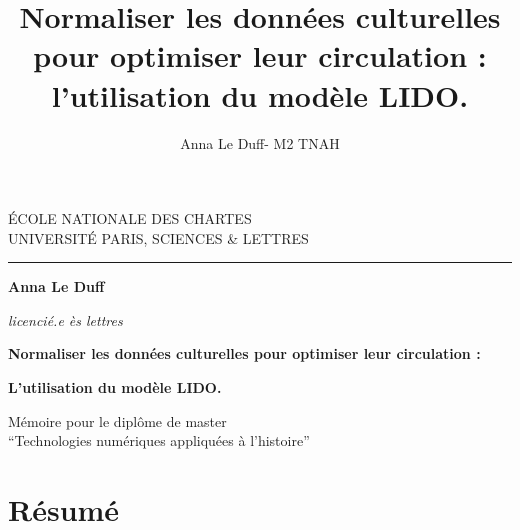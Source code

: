 \documentclass[a4paper,12pt,twoside]{book}
\author{Anna Le Duff- M2 TNAH}
\title{Normaliser les données culturelles pour optimiser leur circulation :  l'utilisation du modèle LIDO.
}
\begin{document}
	\begin{titlepage}
		\begin{center}
			
			\bigskip
			
			\begin{large}				
				ÉCOLE NATIONALE DES CHARTES\\
				UNIVERSITÉ PARIS, SCIENCES \& LETTRES
			\end{large}
			\begin{center}\rule{2cm}{0.02cm}\end{center}
			
			\bigskip
			\bigskip
			\bigskip
			\begin{Large}
				\textbf{Anna Le Duff}\\
			\end{Large}
			\begin{normalsize} \textit{licencié.e ès lettres}\\

			\end{normalsize}
			
			\bigskip
			\bigskip
			\bigskip
			
			\begin{Huge}
				\textbf{Normaliser les données culturelles pour optimiser leur circulation : }\\
			\end{Huge}
			\bigskip
			\bigskip
			\begin{LARGE}
				\textbf{L'utilisation du modèle LIDO.}\\
			\end{LARGE}
			
			\bigskip
			\bigskip
			\bigskip
			\begin{large}
			\end{large}
			\vfill
			
			\begin{large}
				Mémoire 
				pour le diplôme de master \\
				\enquote{Technologies numériques appliquées à l'histoire} \\
			\end{large}
			
		\end{center}
	\end{titlepage}

	\thispagestyle{empty}	
	\cleardoublepage
	
\frontmatter

	\chapter{Résumé}
\medskip
         \newline
	
\end{document}
